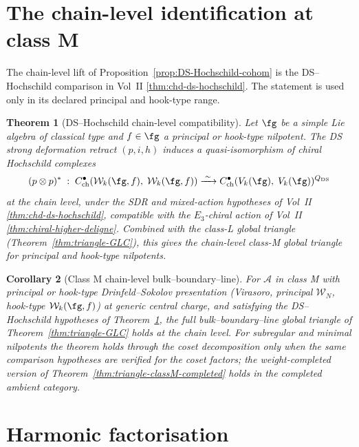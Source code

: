 \documentclass[11pt]{amsart}
\newtheorem{theorem}{Theorem}[section]
\newtheorem{corollary}[theorem]{Corollary}
\theoremstyle{definition}
\theoremstyle{remark}
\providecommand{\cA}{\mathcal{A}}
\providecommand{\cW}{\mathcal{W}}
\begin{document}
\section{The chain-level identification at class M}
\label{sec:class-M-chain-level-scope}

The chain-level lift of Proposition~\ref{prop:DS-Hochschild-cohom}
is the DS--Hochschild comparison in Vol~II
\ref*{thm:chd-ds-hochschild}. The statement is used only in its
declared principal and hook-type range.

\begin{theorem}[DS--Hochschild chain-level compatibility]%
\label{thm:DS-Hochschild-chain-level}%
Let $\fg$ be a simple Lie algebra of classical type and
$f \in \fg$ a principal or hook-type nilpotent. The DS strong
deformation retract $(p, i, h)$ induces a quasi-isomorphism of
chiral Hochschild complexes
\[
  (p \otimes p)^* \;:\;
  C^\bullet_{\mathrm{ch}}(\cW_k(\fg, f),\; \cW_k(\fg, f))
  \xrightarrow{\;\sim\;}
  C^\bullet_{\mathrm{ch}}(V_k(\fg),\; V_k(\fg))^{Q_{\mathrm{DS}}}
\]
at the chain level, under the SDR and mixed-action hypotheses of
Vol~II \ref*{thm:chd-ds-hochschild}, compatible with the
$E_3$-chiral action of Vol~II \ref*{thm:chiral-higher-deligne}.
Combined with the
class-L global triangle (Theorem~\ref{thm:triangle-GLC}), this gives
the chain-level class-M global triangle for principal and hook-type
nilpotents.
\end{theorem}

\begin{corollary}[Class M chain-level bulk--boundary--line]%
\label{cor:class-M-chain-level-triangle}%
For $\cA$ in class M with principal or hook-type Drinfeld--Sokolov
presentation (Virasoro, principal $\cW_N$, hook-type
$\cW_k(\fg, f)$) at generic central charge, and satisfying the
DS--Hochschild hypotheses of
Theorem~\ref{thm:DS-Hochschild-chain-level}, the full
bulk--boundary--line global triangle of
Theorem~\ref{thm:triangle-GLC} holds at the chain level. For
subregular and minimal nilpotents the theorem holds through the
coset decomposition only when the same comparison hypotheses are
verified for the coset factors; the weight-completed version of
Theorem~\ref{thm:triangle-classM-completed} holds in the completed
ambient category.
\end{corollary}

\section{Harmonic factorisation}
\label{sec:harmonic-factorization}
\end{document}
